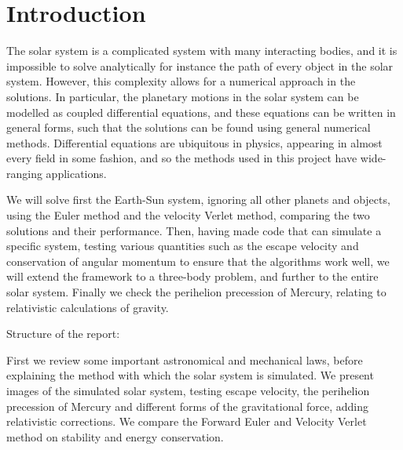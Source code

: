 \documentclass[../main.tex]{subfiles}
\begin{document}
\section{Introduction}\label{sec:introduction}


The solar system is a complicated system with many interacting bodies, and it is impossible to solve analytically for instance the path of every object in the solar system. However, this complexity allows for a numerical approach in the solutions. In particular, the planetary motions in the solar system can be modelled as coupled differential equations, and these equations can be written in general forms, such that the solutions can be found using general numerical methods. Differential equations are ubiquitous in physics, appearing in almost every field in some fashion, and so the methods used in this project have wide-ranging applications.

We will solve first the Earth-Sun system, ignoring all other planets and objects, using the Euler method and the velocity Verlet method, comparing the two solutions and their performance. Then, having made code that can simulate a specific system, testing various quantities such as the escape velocity and conservation of angular momentum to ensure that the algorithms work well, we will extend the framework to a three-body problem, and further to the entire solar system. Finally we check the perihelion precession of Mercury, relating to relativistic calculations of gravity.

Structure of the report:

First we review some important astronomical and mechanical laws, before explaining the method with which the solar system is simulated. We present images of the simulated solar system, testing escape velocity, the perihelion precession of Mercury and different forms of the gravitational force, adding relativistic corrections. We compare the Forward Euler and Velocity Verlet method on stability and energy conservation.
\end{document}
